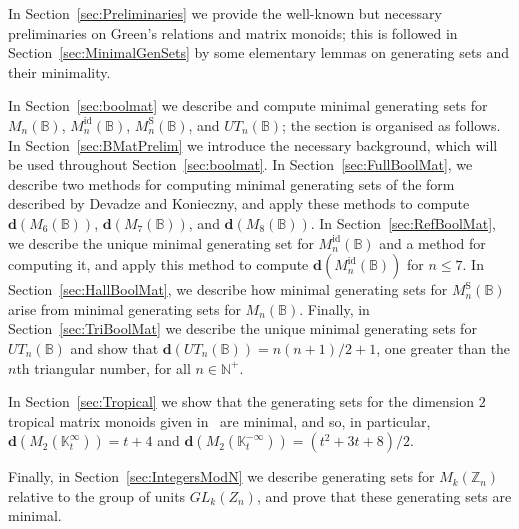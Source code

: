\documentclass[11pt]{article}
\numberwithin{equation}{section}
\newcommand{\B}{\mathbb{B}}
\newcommand{\Bn}{M_n(\B)}
\newcommand{\Refln}{M_n^{\text{id}}(\B)}
\newcommand{\Halln}{M_n^{\text{S}}(\B)}
\newcommand{\UTn}{UT_n(\B)}
\newcommand{\N}{\mathbb{N}}
\newcommand{\Np}{\N^{+}}
\newcommand{\Z}{\mathbb{Z}}
\renewcommand{\d}{\mathbf{d}}
\newcommand{\K}{\mathbb{K}}
\newcommand{\Kmint}{\K^{\infty}_t}
\newcommand{\Kmaxt}{\K^{-\infty}_t}
\begin{document}
In Section~\ref{sec:Preliminaries} we provide the well-known but necessary
preliminaries on Green's relations and matrix monoids; this is followed in
Section~\ref{sec:MinimalGenSets} by some elementary lemmas on generating sets
and their minimality.

In Section~\ref{sec:boolmat} we describe and compute minimal generating sets for
$\Bn$, $\Refln$, $\Halln$, and $\UTn$; the section is organised as follows. In
Section~\ref{sec:BMatPrelim} we introduce the necessary background, which will
be used throughout Section~\ref{sec:boolmat}. In Section~\ref{sec:FullBoolMat},
we describe two methods for computing minimal generating sets of the form
described by Devadze and Konieczny, and apply these methods to compute
$\d(M_6(\B))$, $\d(M_7(\B))$, and $\d(M_8(\B))$. In
Section~\ref{sec:RefBoolMat}, we describe the unique minimal generating set for
$\Refln$ and a method for computing it, and apply this method to compute
$\d(\Refln)$ for $n \leq 7$. In Section~\ref{sec:HallBoolMat}, we describe how
minimal generating sets for $\Halln$ arise from minimal generating sets for
$\Bn$. Finally, in Section~\ref{sec:TriBoolMat} we describe the unique minimal
generating sets for $\UTn$ and show that $\d(\UTn) = n(n+1)/2 + 1$, one greater
than the $n$th triangular number, for all $n \in \Np$.

In Section~\ref{sec:Tropical} we show that the generating sets for the dimension
$2$ tropical matrix monoids given in~\cite{East2020aa} are minimal, and so, in
particular, $\d(M_2(\Kmint)) = t + 4$ and $\d(M_2(\Kmaxt)) = (t^2 + 3t + 8)/2$.

Finally, in Section~\ref{sec:IntegersModN} we describe generating sets for
$M_k(\Z_n)$ relative to the group of units $GL_k(Z_n)$, and prove that these
generating sets are minimal.

\end{document}
